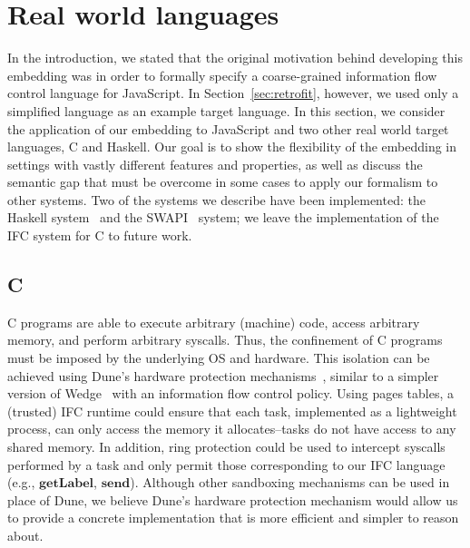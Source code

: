\documentclass{sigplanconf}
\newcommand{\Red}[1]{{\color{red} #1}}
\newcommand{\tocite}[1]{\Red{\cite{#1}}}
\begin{document}
\section{Real world languages}
\label{sec:real}

In the introduction, we stated that the original motivation behind
developing this embedding was in order to formally specify a
coarse-grained information flow control language for JavaScript.
%
In Section~\ref{sec:retrofit}, however, we used only a simplified
language as an example target language.
%
In this section, we consider the application of our embedding to
JavaScript and two other real world target languages, C and Haskell.
%
Our goal is to show the flexibility of the embedding in settings with
vastly different features and properties, as well as discuss the
semantic gap that must be overcome in some cases to apply our formalism
to other systems.
%
Two of the systems we describe have been implemented: the Haskell
system~\cite{lio} and the SWAPI~\tocite{} system; we leave the
implementation of the IFC system for C to future work.

\subsection{C}
\label{sec:real:c}
%
C programs are able to execute arbitrary (machine) code, access
arbitrary memory, and perform arbitrary syscalls.
%
Thus, the confinement of C programs must be imposed by the underlying OS
and hardware.
%
This isolation can be achieved using Dune's hardware protection
mechanisms~\cite{Belay:2012:DSU:2387880.2387913}, similar to a simpler
version of Wedge~\cite{Belay:2012:DSU:2387880.2387913,
Bittau:2008:WSA:1387589.1387611} with an information flow control
policy.
%
Using pages tables, a (trusted) IFC runtime could ensure that each task,
implemented as a lightweight process, can only access the memory it
allocates--tasks do not have access to any shared memory.
%
In addition, ring protection could be used to intercept syscalls performed by
a task and only permit those corresponding to our IFC language (e.g.,
\ensuremath{\mathbf{getLabel}}, \ensuremath{\mathbf{send}}).
%
Although other sandboxing mechanisms can be used in place of Dune, we
believe Dune's hardware protection mechanism would allow us to provide a 
concrete implementation that is more efficient and simpler to reason about.
\end{document}
